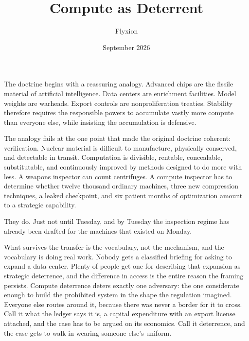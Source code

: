 \documentclass[11pt]{article}
\title{Compute as Deterrent}
\author{Flyxion}
\date{September 2026}
\begin{document}
\maketitle

The doctrine begins with a reassuring analogy. Advanced chips are the fissile material of artificial intelligence. Data centers are enrichment facilities. Model weights are warheads. Export controls are nonproliferation treaties. Stability therefore requires the responsible powers to accumulate vastly more compute than everyone else, while insisting the accumulation is defensive.

The analogy fails at the one point that made the original doctrine coherent: verification. Nuclear material is difficult to manufacture, physically conserved, and detectable in transit. Computation is divisible, rentable, concealable, substitutable, and continuously improved by methods designed to do more with less. A weapons inspector can count centrifuges. A compute inspector has to determine whether twelve thousand ordinary machines, three new compression techniques, a leaked checkpoint, and six patient months of optimization amount to a strategic capability.

They do. Just not until Tuesday, and by Tuesday the inspection regime has already been drafted for the machines that existed on Monday.

What survives the transfer is the vocabulary, not the mechanism, and the vocabulary is doing real work. Nobody gets a classified briefing for asking to expand a data center. Plenty of people get one for describing that expansion as strategic deterrence, and the difference in access is the entire reason the framing persists. Compute deterrence deters exactly one adversary: the one considerate enough to build the prohibited system in the shape the regulation imagined. Everyone else routes around it, because there was never a border for it to cross. Call it what the ledger says it is, a capital expenditure with an export license attached, and the case has to be argued on its economics. Call it deterrence, and the case gets to walk in wearing someone else's uniform.
\end{document}
